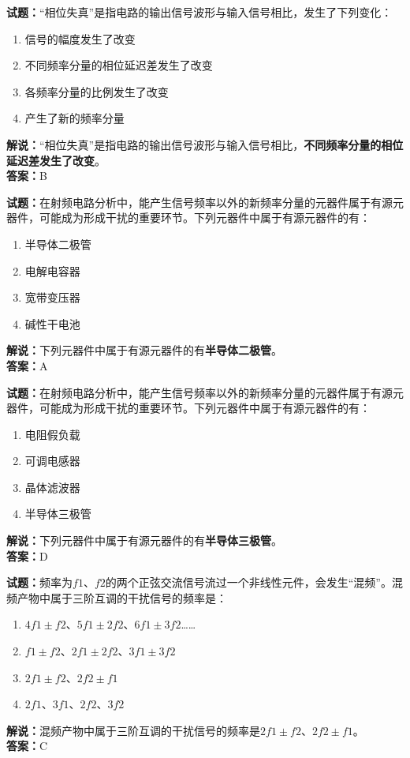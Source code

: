 \documentclass{ctexbook}
\begin{document}

\vspace{1em}

\textbf{试题：}“相位失真”是指电路的输出信号波形与输入信号相比，发生了下列变化：
\begin{enumerate}[leftmargin=3em]
  \item 信号的幅度发生了改变
  \item 不同频率分量的相位延迟差发生了改变
  \item 各频率分量的比例发生了改变
  \item 产生了新的频率分量
\end{enumerate}
\noindent\textbf{解说：}“相位失真”是指电路的输出信号波形与输入信号相比，\textbf{不同频率分量的相位延迟差发生了改变}。\\\noindent\textbf{答案：}B

\vspace{1em}

\textbf{试题：}在射频电路分析中，能产生信号频率以外的新频率分量的元器件属于有源元器件，可能成为形成干扰的重要环节。下列元器件中属于有源元器件的有：
\begin{enumerate}[leftmargin=3em]
  \item 半导体二极管
  \item 电解电容器
  \item 宽带变压器
  \item 碱性干电池
\end{enumerate}
\noindent\textbf{解说：}下列元器件中属于有源元器件的有\textbf{半导体二极管}。\\\noindent\textbf{答案：}A

\vspace{1em}

\textbf{试题：}在射频电路分析中，能产生信号频率以外的新频率分量的元器件属于有源元器件，可能成为形成干扰的重要环节。下列元器件中属于有源元器件的有：
\begin{enumerate}[leftmargin=3em]
  \item 电阻假负载
  \item 可调电感器
  \item 晶体滤波器
  \item 半导体三极管
\end{enumerate}
\noindent\textbf{解说：}下列元器件中属于有源元器件的有\textbf{半导体三极管}。\\\noindent\textbf{答案：}D

\vspace{1em}

\textbf{试题：}频率为\(f1\)、\(f2\)的两个正弦交流信号流过一个非线性元件，会发生“混频”。混频产物中属于三阶互调的干扰信号的频率是：
\begin{enumerate}[leftmargin=3em]
  \item \(4f1\pm f2\)、\(5f1\pm 2f2\)、\(6f1\pm 3f2\)……
  \item \(f1\pm f2\)、\(2f1\pm 2f2\)、\(3f1\pm 3f2\)
  \item \(2f1\pm f2\)、\(2f2\pm f1\)
  \item \(2f1\)、\(3f1\)、\(2f2\)、\(3f2\)
\end{enumerate}
\noindent\textbf{解说：}混频产物中属于三阶互调的干扰信号的频率是\(2f1\pm f2\)、\(2f2\pm f1\)。\\\noindent\textbf{答案：}C
\end{document}
